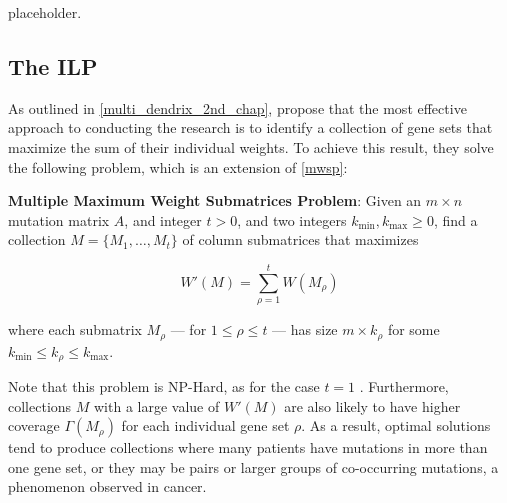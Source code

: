 placeholder. 

\subsection{The ILP}

As outlined in \cref{multi_dendrix_2nd_chap}, \textcite{multi-dendrix} propose that the most effective approach to conducting the research is to identify a collection of gene sets that maximize the sum of their individual weights. To achieve this result, they solve the following problem, which is an extension of \cref{mwsp}:

\begin{displayquote}
    \textbf{Multiple Maximum Weight Submatrices Problem}: Given an $m \times n$ mutation matrix $A$, and integer $t > 0$, and two integers $k_{\mathrm{min}}, k_{\mathrm{max}} \ge 0$, find a collection $M = \{M_1, \ldots, M_t\}$ of column submatrices that maximizes

    \begin{equation}
        W'(M) = \sum_{\rho = 1}^t {W(M_\rho)}
    \end{equation}

    where each submatrix $M_\rho$ --- for $1 \le \rho \le t$ ---  has size $m \times k_\rho$ for some $k_{\mathrm{min}} \le k_\rho \le k_{\mathrm{max}}$.
\end{displayquote}

Note that this problem is NP-Hard, as for the case $t = 1$ . Furthermore, collections $M$ with a large value of $W'(M)$ are also likely to have higher coverage $\Gamma(M_\rho)$ for each individual gene set $\rho$. As a result, optimal solutions tend to produce collections where many patients have mutations in more than one gene set, or they may be pairs or larger groups of co-occurring mutations, a phenomenon observed in cancer. 

